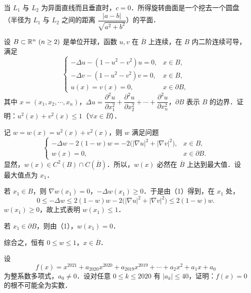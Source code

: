 \begin{solution}
当 $L_1$ 与 $L_2$ 为异面直线而且垂直时，$c=0$．所得旋转曲面是一个挖去一个圆盘（半径为 $L_1$ 与 $L_2$ 之间的距离 $\dfrac{|a-b|}{\sqrt{a^2+b^2}}$）的平面．
\end{solution}

设 $B\subset\mathbb{R}^n\ (n\ge 2)$ 是单位开球，函数 $u,v$ 在 $\overline{B}$ 上连续，在 $B$ 内二阶连续可导，满足
\[
  \begin{cases}
    -\Delta u-(1-u^2-v^2)u=0, & x\in B,\\
    -\Delta v-(1-u^2-v^2)v=0, & x\in B,\\
    u(x)=v(x)=0, & x\in\partial B,
  \end{cases}
\]
其中 $x=(x_1,x_2,\cdots,x_n)$，$\Delta u=\dfrac{\partial^2u}{\partial x_1^2}+\dfrac{\partial^2u}{\partial x_2^2}+\cdots+\dfrac{\partial^2u}{\partial x_n^2}$，$\partial B$ 表示 $B$ 的边界．证明：$u^2(x)+v^2(x)\le 1$（$\forall x\in\overline{B}$）．

\begin{solution}
记 $w=w(x)=u^2(x)+v^2(x)$，则 $w$ 满足问题
\[
  \begin{cases}
    -\Delta w-2(1-w)w=-2\bigl(|\nabla u|^2+|\nabla v|^2\bigr), & x\in B,\\[2pt]
    w(x)=0, & x\in\partial B.
  \end{cases}\tag{1}
\]
显然，$w(x)\in C^2(B)\cap C(\overline{B})$．所以，$w(x)$ 必然在 $\overline{B}$ 上达到最大值．设最大值点为 $x_1$．

若 $x_1\in B$，则 $\nabla w(x_1)=0$，$-\Delta w(x_1)\ge 0$．于是由（1）得到，在 $x_1$ 处，
\[
  0\le-\Delta w\le 2(1-w)w-2\bigl(|\nabla u|^2+|\nabla v|^2\bigr)\le 2(1-w)w.
\]
$w(x_1)\ge 0$，故上式表明 $w(x_1)\le 1$．

若 $x_1\in\partial B$，则由（1），$w(x_1)=0$．

综合之，恒有 $0\le w\le 1$，$x\in\overline{B}$．
\end{solution}

设
\[
  f(x)=x^{2021}+a_{2020}x^{2020}+a_{2019}x^{2019}+\cdots+a_2x^2+a_1x+a_0
\]
为整系数多项式，$a_0\ne 0$．设对任意 $0\le k\le 2020$ 有 $|a_k|\le 40$，证明：$f(x)=0$ 的根不可能全为实数．

